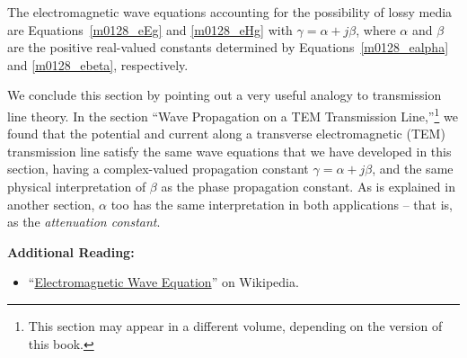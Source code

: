 \begin{mdframed}[backgroundcolor=yellow!20,nobreak=true] 
The electromagnetic wave equations accounting for the possibility of lossy media are Equations~\ref{m0128_eEg} and \ref{m0128_eHg}
with $\gamma=\alpha+j\beta$, where $\alpha$ and $\beta$ are the positive real-valued constants determined by Equations~\ref{m0128_ealpha} and \ref{m0128_ebeta}, respectively. 
\end{mdframed}

We conclude this section by pointing out a very useful analogy to transmission line theory.
In the section ``Wave Propagation on a TEM Transmission Line,''\footnote{This section may appear in a different volume, depending on the version of this book.} we found that the potential and current along a transverse electromagnetic (TEM) transmission line 
satisfy the same wave equations that we have developed in this section, having a complex-valued propagation constant $\gamma=\alpha+j\beta$, and the same physical interpretation of $\beta$ as the phase propagation constant.
As is explained in another section, $\alpha$ too has the same interpretation in both applications -- that is, as the \emph{attenuation constant}.


{\bf Additional Reading:}
\begin{itemize}
\item ``\href{https://en.wikipedia.org/wiki/Electromagnetic_wave_equation}{Electromagnetic Wave Equation}'' on Wikipedia.
\end{itemize}







